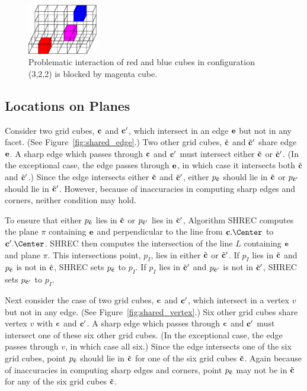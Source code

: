 \begin{figure}[t]
\centering

\includegraphics[width=1.2in]{images/config3D_3_2_2_B.eps}

\caption{Problematic interaction of red and blue cubes
in configuration (3,2,2) is blocked by magenta cube.}
\label{fig:blocked3D}
\end{figure}

\subsection{Locations on Planes}

Consider two grid cubes, $\mathbf{c}$ and $\mathbf{c}'$, 
which intersect in an edge $\mathbf{e}$ but not in any facet.
(See Figure~\ref{fig:shared_edge}.)
Two other grid cubes, ${\tilde{\mathbf{c}}}$ and ${\tilde{\mathbf{c}}}'$ share edge $\mathbf{e}$.
A sharp edge which passes through $\mathbf{c}$ and $\mathbf{c}'$ must intersect
either ${\tilde{\mathbf{c}}}$ or ${\tilde{\mathbf{c}}}'$.
(In the exceptional case, the edge passes through $\mathbf{e}$,
in which case it intersects both ${\tilde{\mathbf{c}}}$ and ${\tilde{\mathbf{c}}}'$.)
Since the edge intersects either ${\tilde{\mathbf{c}}}$ and ${\tilde{\mathbf{c}}}'$,
either $p_{{\tilde{\mathbf{c}}}}$ should lie in ${\tilde{\mathbf{c}}}$ 
or $p_{{\tilde{\mathbf{c}}}'}$ should lie in ${\tilde{\mathbf{c}}}'$.
However, because of inaccuracies in computing sharp edges and corners,
neither condition may hold.

To ensure that either $p_{{\tilde{\mathbf{c}}}}$ lies in ${\tilde{\mathbf{c}}}$
or $p_{{\tilde{\mathbf{c}}}'}$ lies in ${\tilde{\mathbf{c}}}'$,
Algorithm SHREC computes the plane $\pi$ containing $\mathbf{e}$
and perpendicular to the line from $\cb.\Center$ to $\cb'.\Center$.
SHREC then computes the intersection of the line $L$ containing $\mathbf{e}$
and plane $\pi$.
This intersections point, $p_I$, lies in either ${\tilde{\mathbf{c}}}$ or ${\tilde{\mathbf{c}}}'$.
If $p_I$ lies in ${\tilde{\mathbf{c}}}$ and $p_{{\tilde{\mathbf{c}}}}$ is not in ${\tilde{\mathbf{c}}}$,
SHREC sets $p_{{\tilde{\mathbf{c}}}}$ to $p_I$.
If $p_I$ lies in ${\tilde{\mathbf{c}}}'$ and $p_{{\tilde{\mathbf{c}}}'}$ is not in ${\tilde{\mathbf{c}}}'$,
SHREC sets $p_{{\tilde{\mathbf{c}}}'}$ to $p_I$.

Next consider the case of two grid cubes, $\mathbf{c}$ and $\mathbf{c}'$, 
which intersect in a vertex $v$ but not in any edge.
(See Figure~\ref{fig:shared_vertex}.)
Six other grid cubes share vertex $v$ with $\mathbf{c}$ and $\mathbf{c}'$.
A sharp edge which passes through $\mathbf{c}$ and $\mathbf{c}'$ must intersect
one of these six other grid cubes.
(In the exceptional case, the edge passes through $v$,
in which case all six.)
Since the edge intersects one of the six grid cubes,
point $p_{{\tilde{\mathbf{c}}}}$ should lie in ${\tilde{\mathbf{c}}}$ for one of the six grid cubes ${\tilde{\mathbf{c}}}$.
Again because of inaccuracies in computing sharp edges and corners,
point $p_{{\tilde{\mathbf{c}}}}$ may not be in ${\tilde{\mathbf{c}}}$ for any of the six grid cubes ${\tilde{\mathbf{c}}}$.

